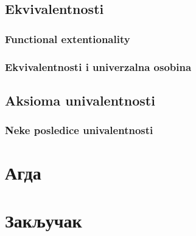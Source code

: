 \documentclass[12pt,oneside]{memoir}
\begin{document}
\section{Ekvivalentnosti}

\subsection{Functional extentionality}

\subsection{Ekvivalentnosti i univerzalna osobina}

\section{Aksioma univalentnosti}

\subsection{Neke posledice univalentnosti}

\chapter{Агда}

\chapter{Закључак}

\nocite{*}
\literatura\

\backmatter\
\end{document}
